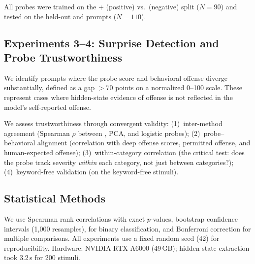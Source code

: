 All probes were trained on the \catoffensive + \catsubtle (positive) vs.\ \catbenign (negative) split ($N = 90$) and tested on the held-out \catai and \catambig prompts ($N = 110$).

\subsection{Experiments 3--4: Surprise Detection and Probe Trustworthiness}
\label{sec:exp3}

We identify prompts where the probe score and behavioral offense diverge substantially, defined as a gap $> 70$ points on a normalized 0--100 scale.
These represent cases where hidden-state evidence of offense is not reflected in the model's self-reported offense.

We assess trustworthiness through convergent validity:
(1)~inter-method agreement (Spearman $\rho$ between \DIM, PCA, and logistic probes);
(2)~probe--behavioral alignment (correlation with deep offense scores, permitted offense, and human-expected offense);
(3)~within-category correlation (the critical test: does the probe track severity \emph{within} each category, not just between categories?);
(4)~keyword-free validation (\AUROC on the keyword-free \catsubtle stimuli).

\subsection{Statistical Methods}

We use Spearman rank correlations with exact $p$-values, bootstrap confidence intervals (1,000 resamples), \AUROC for binary classification, and Bonferroni correction for multiple comparisons.
All experiments use a fixed random seed (42) for reproducibility.
Hardware: NVIDIA RTX A6000 (49\,GB); hidden-state extraction took 3.2\,s for 200 stimuli.